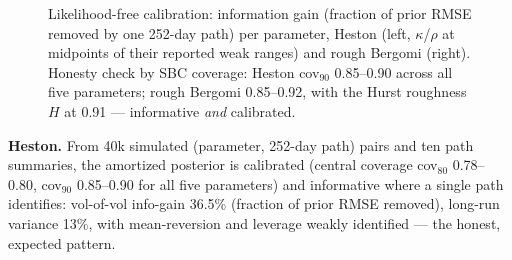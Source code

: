 \documentclass[11pt]{article}
\theoremstyle{remark}
\begin{document}
\begin{figure}[t]
\centering
{}\hfill
{}
\caption{Likelihood-free calibration: information gain (fraction of
prior RMSE removed by one 252-day path) per parameter, Heston (left,
$\kappa$/$\rho$ at midpoints of their reported weak ranges) and rough
Bergomi (right). Honesty check by SBC coverage: Heston cov$_{90}$
0.85--0.90 across all five parameters; rough Bergomi 0.85--0.92, with
the Hurst roughness $H$ at 0.91 --- informative \emph{and} calibrated.}
\label{fig:sbc}
\end{figure}

\textbf{Heston.} From 40k simulated (parameter, 252-day path) pairs and
ten path summaries, the amortized posterior is calibrated (central
coverage cov$_{80}$ 0.78--0.80, cov$_{90}$ 0.85--0.90 for all five
parameters) and informative where a single path identifies:
vol-of-vol info-gain 36.5\% (fraction of prior RMSE removed), long-run
variance 13\%, with mean-reversion and leverage weakly identified ---
the honest, expected pattern.
\end{document}
